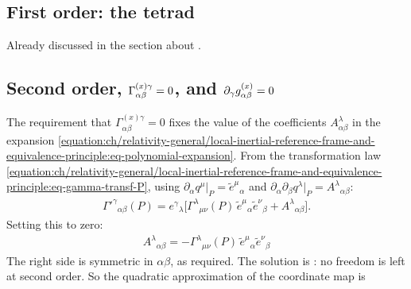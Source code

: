 \documentclass[letterpaper,10pt,english]{jupyterBook}
\begin{document}
\subsection{First order: the tetrad}
\label{\detokenize{ch/relativity-general/local-inertial-reference-frame-and-equivalence-principle:first-order-the-tetrad}}
\sphinxAtStartPar
Already discussed in the section about {\hyperref[\detokenize{ch/relativity-general/local-inertial-reference-frame-and-equivalence-principle:general-relativity-local-inertial-reference-frame-local-coordinates}]{}}.


\subsection{Second order, \protect\(\Gamma^{(x) \gamma}_{\alpha \beta} = 0\protect\), and \protect\(\partial_{\gamma} g^{(x)}_{\alpha \beta} = 0\protect\)}
\label{\detokenize{ch/relativity-general/local-inertial-reference-frame-and-equivalence-principle:second-order-gamma-x-gamma-alpha-beta-0-and-partial-gamma-g-x-alpha-beta-0}}
\sphinxAtStartPar
The requirement that \(\Gamma^{(x) \gamma}_{\alpha \beta} = 0\) fixes the value of the coefficients \(A^{\lambda}_{\alpha \beta}\) in the expansion \eqref{equation:ch/relativity-general/local-inertial-reference-frame-and-equivalence-principle:eq-polynomial-expansion}.
From the transformation law \eqref{equation:ch/relativity-general/local-inertial-reference-frame-and-equivalence-principle:eq-gamma-transf-P}, using \(\partial_\alpha q^\mu|_P=\tilde e^\mu{}_\alpha\) and \(\partial_\alpha\partial_\beta q^\lambda|_P=A^\lambda{}_{\alpha\beta}\):
\begin{equation*}
\begin{split}
\Gamma'^\gamma{}_{\alpha\beta}(P)=e^\gamma{}_\lambda\Big[\Gamma^\lambda{}_{\mu\nu}(P)\,\tilde e^\mu{}_\alpha\tilde e^\nu{}_\beta+A^\lambda{}_{\alpha\beta}\Big].
\end{split}
\end{equation*}
\sphinxAtStartPar
Setting this to zero:
\begin{equation}\label{equation:ch/relativity-general/local-inertial-reference-frame-and-equivalence-principle:eq-A}
\begin{split}
\boxed{\,A^\lambda{}_{\alpha\beta}=-\Gamma^\lambda{}_{\mu\nu}(P)\,\tilde e^\mu{}_\alpha\tilde e^\nu{}_\beta\,}
\end{split}
\end{equation}
\sphinxAtStartPar
The right side is symmetric in \(\alpha\beta\), as required. The solution is : no freedom is left at second order. So the quadratic approximation of the coordinate map is
\end{document}
